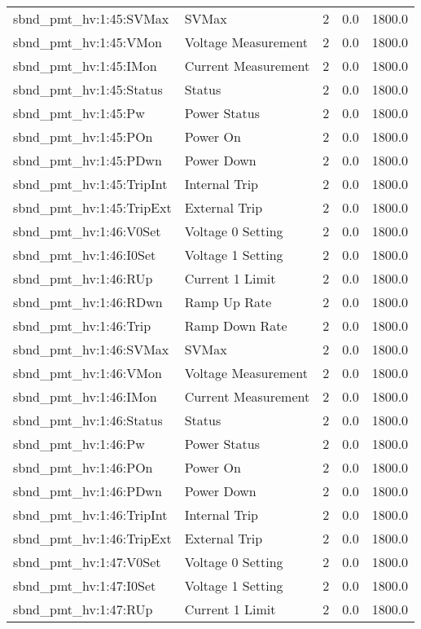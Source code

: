 \begin{center}
\begin{longtable}{l | l l l l }
sbnd\_pmt\_hv:1:45:SVMax & SVMax & 2 & 0.0 & 1800.0\\ 
sbnd\_pmt\_hv:1:45:VMon & Voltage Measurement & 2 & 0.0 & 1800.0\\ 
sbnd\_pmt\_hv:1:45:IMon & Current Measurement & 2 & 0.0 & 1800.0\\ 
sbnd\_pmt\_hv:1:45:Status & Status & 2 & 0.0 & 1800.0\\ 
sbnd\_pmt\_hv:1:45:Pw & Power Status & 2 & 0.0 & 1800.0\\ 
sbnd\_pmt\_hv:1:45:POn & Power On & 2 & 0.0 & 1800.0\\ 
sbnd\_pmt\_hv:1:45:PDwn & Power Down & 2 & 0.0 & 1800.0\\ 
sbnd\_pmt\_hv:1:45:TripInt & Internal Trip & 2 & 0.0 & 1800.0\\ 
sbnd\_pmt\_hv:1:45:TripExt & External Trip & 2 & 0.0 & 1800.0\\ 
sbnd\_pmt\_hv:1:46:V0Set & Voltage 0 Setting & 2 & 0.0 & 1800.0\\ 
sbnd\_pmt\_hv:1:46:I0Set & Voltage 1 Setting & 2 & 0.0 & 1800.0\\ 
sbnd\_pmt\_hv:1:46:RUp & Current 1 Limit & 2 & 0.0 & 1800.0\\ 
sbnd\_pmt\_hv:1:46:RDwn & Ramp Up Rate & 2 & 0.0 & 1800.0\\ 
sbnd\_pmt\_hv:1:46:Trip & Ramp Down Rate & 2 & 0.0 & 1800.0\\ 
sbnd\_pmt\_hv:1:46:SVMax & SVMax & 2 & 0.0 & 1800.0\\ 
sbnd\_pmt\_hv:1:46:VMon & Voltage Measurement & 2 & 0.0 & 1800.0\\ 
sbnd\_pmt\_hv:1:46:IMon & Current Measurement & 2 & 0.0 & 1800.0\\ 
sbnd\_pmt\_hv:1:46:Status & Status & 2 & 0.0 & 1800.0\\ 
sbnd\_pmt\_hv:1:46:Pw & Power Status & 2 & 0.0 & 1800.0\\ 
sbnd\_pmt\_hv:1:46:POn & Power On & 2 & 0.0 & 1800.0\\ 
sbnd\_pmt\_hv:1:46:PDwn & Power Down & 2 & 0.0 & 1800.0\\ 
sbnd\_pmt\_hv:1:46:TripInt & Internal Trip & 2 & 0.0 & 1800.0\\ 
sbnd\_pmt\_hv:1:46:TripExt & External Trip & 2 & 0.0 & 1800.0\\ 
sbnd\_pmt\_hv:1:47:V0Set & Voltage 0 Setting & 2 & 0.0 & 1800.0\\ 
sbnd\_pmt\_hv:1:47:I0Set & Voltage 1 Setting & 2 & 0.0 & 1800.0\\ 
sbnd\_pmt\_hv:1:47:RUp & Current 1 Limit & 2 & 0.0 & 1800.0\\ 

\end{longtable}
\end{center}
